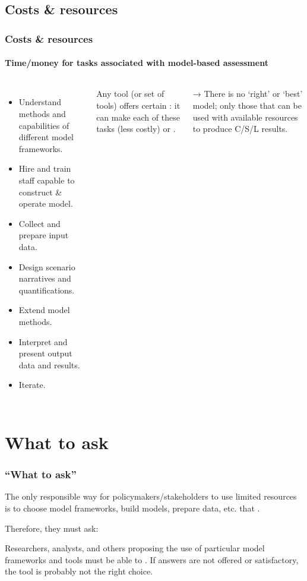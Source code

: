 \documentclass[12pt,aspectratio=169]{beamer}
\begin{document}
\subsection{Costs \& resources}
\begin{frame}
\frametitle{Costs \& resources}
\framesubtitle{Time/money for tasks associated with model-based assessment}

\begin{columns}[T]
\begin{itemize}
  \item Understand methods and capabilities of different model frameworks.
  \item Hire and train staff capable to construct \& operate model.
  \item Collect and prepare input data.
  \item Design scenario narratives and quantifications.
  \item Extend model methods.
  \item Interpret and present output data and results.
  \item Iterate.
\end{itemize}

Any tool (or set of tools) offers certain : it can make each of these tasks  (less costly) or .

\bigskip
→ There is no ‘right’ or ‘best’ model; only those that can be used with available resources to produce C/S/L results.
\end{columns}

\end{frame}

\section{What to ask}

\begin{frame}
\frametitle{“What to ask”}

The only responsible way for policymakers/stakeholders to use limited resources is to choose model frameworks, build models, prepare data, etc. that .

\bigskip
Therefore, they must ask: 

\bigskip
Researchers, analysts, and others proposing the use of particular model frameworks and tools must be able to .
If answers are not offered or satisfactory, the tool is probably not the right choice.

\end{frame}
\end{document}
